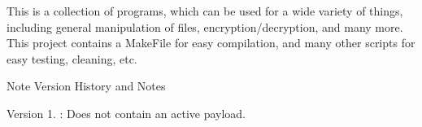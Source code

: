 This is a collection of programs, which can be used for a wide variety of things, including general manipulation of files, encryption/decryption, and many more. This project contains a Make\+File for easy compilation, and many other scripts for easy testing, cleaning, etc. \begin{DoxyNote}{Note}
Version History and Notes
\end{DoxyNote}
Version 1. \+: Does not contain an active payload. 